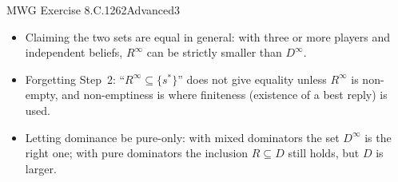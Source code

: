 \begin{exsol}{MWG Exercise 8.C.1}{262}{Advanced}{3}
\mistakes
\begin{itemize}
  \item Claiming the two sets are equal in general: with three or more players and independent
  beliefs, $R^\infty$ can be strictly smaller than $D^\infty$.
  \item Forgetting Step~2: ``$R^\infty \subseteq \{s^*\}$'' does not give equality unless $R^\infty$ is
  non-empty, and non-emptiness is where finiteness (existence of a best reply) is used.
  \item Letting dominance be pure-only: with mixed dominators the set $D^\infty$ is the right one; with pure
  dominators the inclusion $R \subseteq D$ still holds, but $D$ is larger.
\end{itemize}
\end{exsol}

